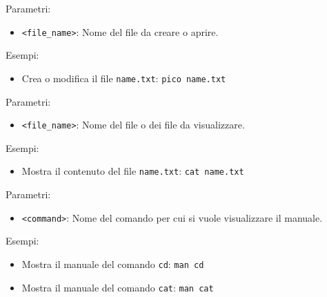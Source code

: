 \vskip3mm
Parametri:
\begin{itemize}
	\item \verb|<file_name>|: Nome del file da creare o aprire.
\end{itemize}
Esempi:
\begin{itemize}
	\item Crea o modifica il file \verb|name.txt|:
	      \vskip3mm
	      \verb|pico name.txt|
\end{itemize}

\vskip3mm
Parametri:
\begin{itemize}
	\item \verb|<file_name>|: Nome del file o dei file da visualizzare.
\end{itemize}
Esempi:
\begin{itemize}
	\item Mostra il contenuto del file \verb|name.txt|:
	      \vskip3mm
	      \verb|cat name.txt|
\end{itemize}

\vskip3mm
Parametri:
\begin{itemize}
	\item \verb|<command>|: Nome del comando per cui si vuole visualizzare il manuale.
\end{itemize}
Esempi:
\begin{itemize}
	\item Mostra il manuale del comando \verb|cd|:
	      \vskip3mm
	      \verb|man cd|
	\item Mostra il manuale del comando \verb|cat|:
	      \vskip3mm
	      \verb|man cat|
\end{itemize}

